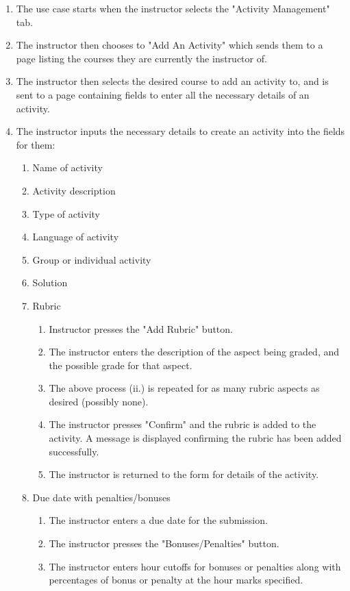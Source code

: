 \documentclass{article}
\begin{document}
\begin{enumerate}
	\item The use case starts when the instructor selects the "Activity Management" tab.
	\item The instructor then chooses to "Add An Activity" which sends them to a page listing
		the courses they are currently the instructor of.
	\item The instructor then selects the desired course to add an activity to, and is sent to 	
		a page containing fields to enter all the necessary details of an activity.
	\item The instructor inputs the necessary details to create an activity into the fields for
		them:
	\begin{enumerate}
		\item Name of activity
		\item Activity description
		\item Type of activity
		\item Language of activity
		\item Group or individual activity
		\item Solution
		\item Rubric
		\begin{enumerate}
			\item 	Instructor presses the "Add Rubric" button.
			\item The instructor enters the description of the aspect being graded, and the 
					possible grade for that aspect.
			\item The above process (ii.) is repeated for as many rubric aspects as desired
					(possibly none).
			\item The instructor presses "Confirm" and the rubric is added to the activity.
					A message is displayed confirming the rubric has been added successfully.
			\item The instructor is returned to the form for details of the activity.
		\end{enumerate}
		\item Due date with penalties/bonuses
			\begin{enumerate}
				\item The instructor enters a due date for the submission.
				\item The instructor presses the "Bonuses/Penalties" button.
				\item The instructor enters hour cutoffs for bonuses or penalties along with
						percentages of bonus or penalty at the hour marks specified.

\end{enumerate}
\end{enumerate}
\end{enumerate}
\end{document}
